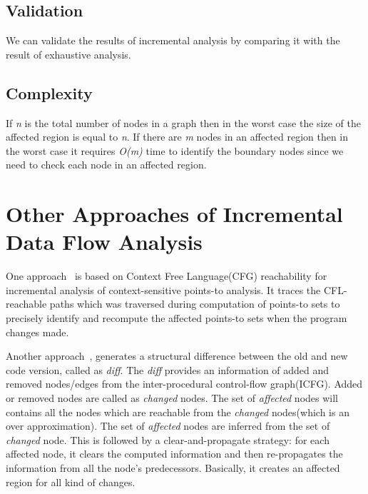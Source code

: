 \documentclass[11pt,a4paper,openright]{report}
\begin{document}

\subsection{Validation}
We can validate the results of incremental analysis by comparing it with the result of exhaustive analysis. 


\subsection{Complexity}
If \textit{n} is the total number of nodes in a graph then in the worst case the size of the affected region is equal to \textit{n}. If there are \textit{m} nodes in an 
affected region then in the worst case it requires \textit{O(m)} time to identify the boundary nodes since we need to check each node in an affected region.  




\section{Other Approaches of Incremental Data Flow Analysis}
One approach~\cite{inc1} is based on Context Free Language(CFG) reachability for incremental analysis of context-sensitive points-to analysis. It traces the CFL-reachable
paths which was traversed during computation of points-to sets to precisely identify and recompute the affected points-to sets when the program changes made. 

Another approach~\cite{inc2}, generates a structural difference between the old and new code version, called as \textit{diff}. The \textit{diff} 
provides an information of added and removed nodes/edges from the inter-procedural control-flow graph(ICFG). Added or removed nodes are called as
\textit{changed} nodes. The set of \textit{affected} nodes will contains all the nodes which are reachable from the \textit{changed} nodes(which is an over approximation). The set of \textit{affected} nodes are inferred from the set of \textit{changed} node. 
This is followed by a clear-and-propagate strategy: for each affected node, it clears the  computed information
and then re-propagates the information from all the node’s predecessors. Basically, it creates an affected region for all kind of changes.
\end{document}
